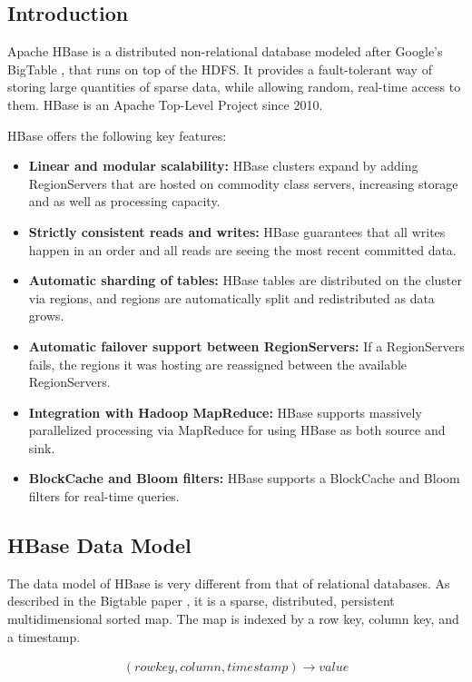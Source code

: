 \subsection{Introduction}

Apache HBase \cite{hbase} is a distributed non-relational database modeled after Google's BigTable \cite{bigtable}, that runs on top of the HDFS. It provides a fault-tolerant way of storing large quantities of sparse data, while allowing random, real-time access to them. HBase is an Apache Top-Level Project since 2010.

HBase offers the following key features:
\begin{itemize}
\item \textbf{Linear and modular scalability:} HBase clusters expand by adding RegionServers that are hosted on commodity class servers, increasing storage and as well as processing capacity.
\item \textbf{Strictly consistent reads and writes:} HBase guarantees that all writes happen in an order and all reads are seeing the most recent committed data.
\item \textbf{Automatic sharding of tables:} HBase tables are distributed on the cluster via regions, and regions are automatically split and redistributed as data grows.
\item \textbf{Automatic failover support between RegionServers:} If a RegionServers fails, the regions it was hosting are reassigned between the available RegionServers.
\item \textbf{Integration with Hadoop MapReduce:} HBase supports massively parallelized processing via MapReduce for using HBase as both source and sink.
\item \textbf{BlockCache and Bloom filters:} HBase supports a BlockCache and Bloom filters for real-time queries.
\end{itemize}

\subsection{HBase Data Model}

The data model of HBase is very different from that of relational databases. As described in the Bigtable paper \cite{bigtable}, it is a sparse, distributed, persistent multidimensional sorted map. The map is indexed by a row key, column key, and a timestamp.

\begin{gather*}
(rowkey, column, timestamp) \rightarrow value
\end{gather*}

